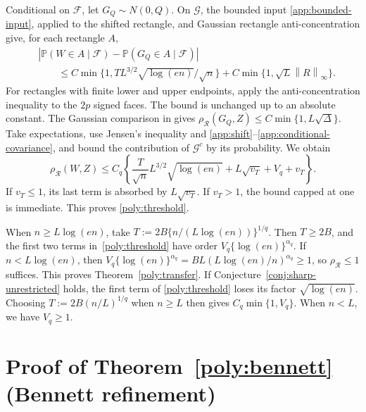 \documentclass[11pt,letterpaper]{article}
\theoremstyle{remark}
\newcommand{\Pp}{\mathbb P}
\newcommand{\norm}[1]{\left\lVert#1\right\rVert}
\newcommand{\rh}{\rho_{\mathcal R}}
\begin{document}
Conditional on \(\mathcal F\), let \(G_Q\sim N(0,Q)\). On
\(\mathcal G\), the bounded input \eqref{app:bounded-input}, applied
to the shifted rectangle, and Gaussian rectangle anti-concentration
give, for each rectangle \(A\),
\begin{align*}
 &|\Pp(W\in A\mid\mathcal F)-\Pp(G_Q\in A\mid\mathcal F)|\\
 &\hspace{2em}\le
 C\min\{1,TL^{3/2}\sqrt{\log(en)}/\sqrt n\}
       +C\min\{1,\sqrt L\norm R_\infty\}.
\end{align*}
For rectangles with finite lower and upper endpoints, apply the
anti-concentration inequality to the \(2p\) signed faces. The bound
is unchanged up to an absolute constant. The Gaussian comparison in
\cite[Proposition~2.1]{CCKK2022} gives
\(\rh(G_Q,Z)\le C\min\{1,L\sqrt\Delta\}\).
Take expectations, use Jensen's inequality and
\eqref{app:shift}--\eqref{app:conditional-covariance}, and bound the
contribution of \(\mathcal G^c\) by its probability. We obtain
\[
 \rh(W,Z)\le C_q\left\{
 \frac{T}{\sqrt n}L^{3/2}\sqrt{\log(en)}
 +L\sqrt{v_T}+V_q+v_T\right\}.
\]
If \(v_T\le1\), its last term is absorbed by \(L\sqrt{v_T}\).
If \(v_T>1\), the bound capped at one is immediate. This proves
\eqref{poly:threshold}.

When \(n\ge L\log(en)\), take \(T:=2B\{n/(L\log(en))\}^{1/q}\).
Then \(T\ge2B\), and the first two terms in~\eqref{poly:threshold}
have order \(V_q\{\log(en)\}^{\alpha_q}\). If \(n<L\log(en)\), then
\(V_q\{\log(en)\}^{\alpha_q}=BL(L\log(en)/n)^{\alpha_q}\ge1\), so \(\rh\le1\)
suffices. This proves Theorem~\ref{poly:transfer}. If
Conjecture~\ref{conj:sharp-unrestricted} holds, the first term of
\eqref{poly:threshold} loses its factor \(\sqrt{\log(en)}\).
Choosing \(T:=2B(n/L)^{1/q}\) when \(n\ge L\) then gives
\(C_q\min\{1,V_q\}\). When \(n<L\), we have \(V_q\ge1\).

\section{Proof of Theorem~\ref*{poly:bennett} (Bennett refinement)}\label{app:bennett}
\end{document}
